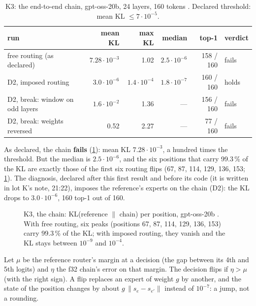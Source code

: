 \begin{table}[!htbp]
\centering\small
\caption[K3: the end-to-end chain]{K3: the end-to-end chain, gpt-oss-20b, 24 layers, 160 tokens \mes. Declared threshold: mean KL $\le 7\cdot10^{-5}$.}
\label{tab:t2n-chaine}
\footnotesize
\begin{tabular}{@{}lrrrrl@{}}
\toprule
run & mean KL & max KL & median & top-1 & verdict \\
\midrule
free routing (as declared) & $7.28\cdot10^{-3}$ & 1.02 & $2.5\cdot10^{-6}$ & 158 / 160 & fails \\
D2, imposed routing & $3.0\cdot10^{-6}$ & $1.4\cdot10^{-4}$ & $1.8\cdot10^{-7}$ & 160 / 160 & holds \\
D2, break: window on odd layers & $1.6\cdot10^{-2}$ & 1.36 & — & 156 / 160 & fails \\
D2, break: weights reversed & 0.52 & 2.27 & — & 77 / 160 & fails \\
\bottomrule
\end{tabular}
\end{table}

As declared, the chain \textbf{fails} (\cref{tab:t2n-chaine}): mean KL $7.28\cdot10^{-3}$, a hundred times the threshold. But the median is $2.5\cdot10^{-6}$, and the six positions that carry 99.3\,\% of the KL are exactly those of the first six routing flips (67, 87, 114, 129, 136, 153; \cref{fig:t2n-chaine}). The diagnosis, declared after this first result and before its code (it is written in lot K's note, 21:22), imposes the reference's experts on the chain (D2): the KL drops to $3.0\cdot10^{-6}$, 160 top-1 out of 160.

\begin{figure}[!htbp]
\centering
\GrapheNoyChaine
\caption[K3: KL per position, free against imposed routing]{K3, the chain: KL(reference $\|$ chain) per position, gpt-oss-20b \mes. With free routing, six peaks (positions 67, 87, 114, 129, 136, 153) carry 99.3\,\% of the KL; with imposed routing, they vanish and the KL stays between $10^{-9}$ and $10^{-4}$.}
\label{fig:t2n-chaine}
\end{figure}

\begin{proposition}\label{prop:t2n-bascule}
Let $\mu$ be the reference router's margin at a decision (the gap between its 4th and 5th logits) and $\eta$ the f32 chain's error on that margin. The decision flips if $\eta > \mu$ (with the right sign). A flip replaces an expert of weight $g$ by another, and the state of the position changes by about $g\,\|s_e - s_{e'}\|$ instead of $10^{-7}$: a jump, not a rounding.
\end{proposition}

